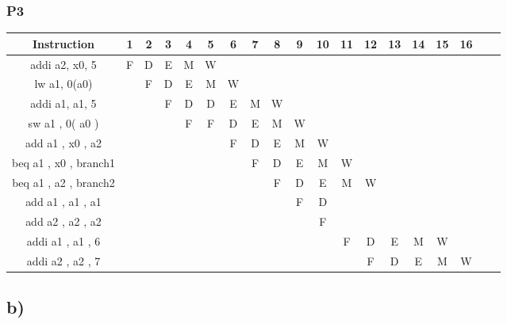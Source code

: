 \subsubsection*{P3}

\begin{center}
    \tiny
    \begin{tabular}{c | c | c | c | c | c | c | c | c | c | c | c | c | c | c | c | c | c | c }
        \textbf{Instruction} & \textbf{1} & \textbf{2} & \textbf{3} & \textbf{4} & \textbf{5} & \textbf{6} & \textbf{7} & \textbf{8} & \textbf{9} & \textbf{10} & \textbf{11} & \textbf{12} & \textbf{13} & \textbf{14} & \textbf{15} & \textbf{16} \\
        \hline
        addi a2, x0, 5           & F & D & E & M & W &   &   &   &   &   &   &   &   &   &   &  \\
        lw a1, 0(a0)             &   & F & D & E & M & W &   &   &   &   &   &   &   &   &   &  \\
        addi a1, a1, 5           &   &   & F & D & D & E & M & W &   &   &   &   &   &   &   &  \\
        sw a1 , 0( a0 )          &   &   &   & F & F & D & E & M & W &   &   &   &   &   &   &  \\
        add a1 , x0 , a2         &   &   &   &   &   & F & D & E & M & W &   &   &   &   &   &  \\
        beq a1 , x0 , branch1    &   &   &   &   &   &   & F & D & E & M & W &   &   &   &   &  \\
        beq a1 , a2 , branch2    &   &   &   &   &   &   &   & F & D & E & M & W &   &   &   &  \\
        add a1 , a1 , a1         &   &   &   &   &   &   &   &   & F & D &   &   &   &   &   &  \\
        add a2 , a2 , a2         &   &   &   &   &   &   &   &   &   & F &   &   &   &   &   &  \\
        addi a1 , a1 , 6         &   &   &   &   &   &   &   &   &   &   & F & D & E & M & W &  \\
        addi a2 , a2 , 7         &   &   &   &   &   &   &   &   &   &   &   & F & D & E & M & W \\
    \end{tabular}
\end{center}

\subsection*{\textbf{b)}}

